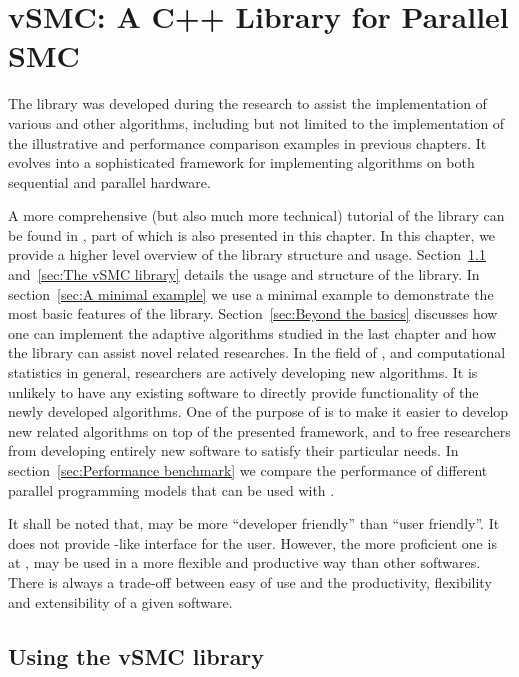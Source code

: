 \chapter{vSMC: A C++ Library for Parallel SMC}
\label{cha:vSMC: A C++ Library for Parallel SMC}

The \vsmc library \cite{software:VSMC} was developed during the research to
assist the implementation of various \smc and other algorithms, including but
not limited to the implementation of the illustrative and performance
comparison examples in previous chapters. It evolves into a sophisticated \cpp
framework for implementing \smc algorithms on both sequential and parallel
hardware.

A more comprehensive (but also much more technical) tutorial of the library
can be found in \cite{software:VSMC}, part of which is also presented in this
chapter. In this chapter, we provide a higher level overview of the library
structure and usage. Section~\ref{sec:Using the vSMC library} and~\ref{sec:The
  vSMC library} details the usage and structure of the library. In
section~\ref{sec:A minimal example} we use a minimal example to demonstrate
the most basic features of the library. Section~\ref{sec:Beyond the basics}
discusses how one can implement the adaptive algorithms studied in the last
chapter and how the library can assist novel \smc related researches. In the
field of \smc, and computational statistics in general, researchers are
actively developing new algorithms. It is unlikely to have any existing
software to directly provide functionality of the newly developed algorithms.
One of the purpose of \vsmc is to make it easier to develop new \smc related
algorithms on top of the presented framework, and to free researchers from
developing entirely new software to satisfy their particular needs. In
section~\ref{sec:Performance benchmark} we compare the performance of
different parallel programming models that can be used with \vsmc.

It shall be noted that, \vsmc may be more ``developer friendly'' than ``user
friendly''. It does not provide \bugs-like interface for the user. However,
the more proficient one is at \cpp, \vsmc may be used in a more flexible and
productive way than other softwares. There is always a trade-off between easy
of use and the productivity, flexibility and extensibility of a given
software.

\section{Using the vSMC library}
\label{sec:Using the vSMC library}

